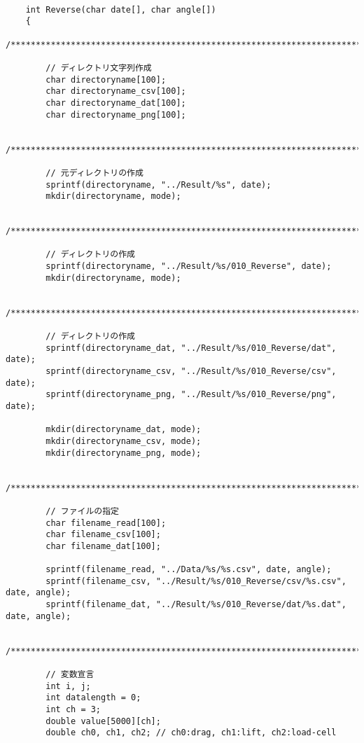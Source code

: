 \documentclass[12pt,a4paper]{jsarticle}
\author{}
\title{}
\begin{document}
\scriptsize{

\begin{lstlisting}

    int Reverse(char date[], char angle[])
    {
        /*****************************************************************************/
    
        // ディレクトリ文字列作成
        char directoryname[100];
        char directoryname_csv[100];
        char directoryname_dat[100];
        char directoryname_png[100];
    
        /*****************************************************************************/
    
        // 元ディレクトリの作成
        sprintf(directoryname, "../Result/%s", date);
        mkdir(directoryname, mode);
    
        /*****************************************************************************/
    
        // ディレクトリの作成
        sprintf(directoryname, "../Result/%s/010_Reverse", date);
        mkdir(directoryname, mode);
    
        /*****************************************************************************/
    
        // ディレクトリの作成
        sprintf(directoryname_dat, "../Result/%s/010_Reverse/dat", date);
        sprintf(directoryname_csv, "../Result/%s/010_Reverse/csv", date);
        sprintf(directoryname_png, "../Result/%s/010_Reverse/png", date);
    
        mkdir(directoryname_dat, mode);
        mkdir(directoryname_csv, mode);
        mkdir(directoryname_png, mode);
    
        /*****************************************************************************/
    
        // ファイルの指定
        char filename_read[100];
        char filename_csv[100];
        char filename_dat[100];
    
        sprintf(filename_read, "../Data/%s/%s.csv", date, angle);
        sprintf(filename_csv, "../Result/%s/010_Reverse/csv/%s.csv", date, angle);
        sprintf(filename_dat, "../Result/%s/010_Reverse/dat/%s.dat", date, angle);
    
        /*****************************************************************************/
    
        // 変数宣言
        int i, j;
        int datalength = 0;
        int ch = 3;
        double value[5000][ch];
        double ch0, ch1, ch2; // ch0:drag, ch1:lift, ch2:load-cell
    

\end{lstlisting}}
\end{document}
